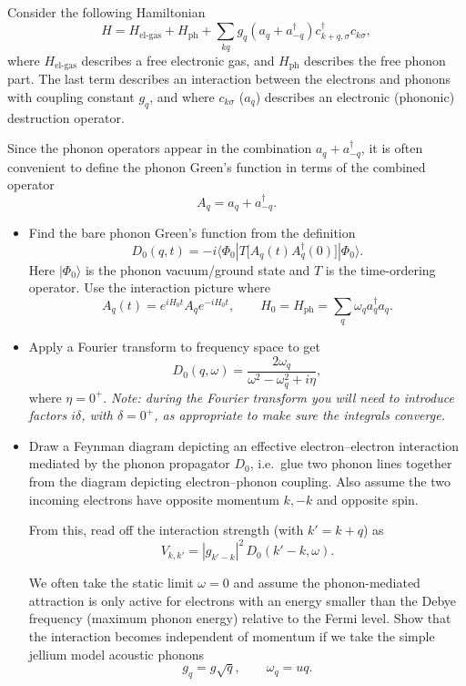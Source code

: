 \begin{Problem}

Consider the following Hamiltonian
\[
H = H_{\text{el-gas}} + H_{\text{ph}} + \sum_{kq} g_q \left(a_q + a_{-q}^\dagger\right)
c_{k+q,\sigma}^\dagger c_{k\sigma},
\]
where \(H_{\text{el-gas}}\) describes a free electronic gas, and
\(H_{\text{ph}}\) describes the free phonon part. The last term describes
an interaction between the electrons and phonons with coupling constant
\(g_q\), and where \(c_{k\sigma}\) (\(a_q\)) describes an electronic
(phononic) destruction operator.

Since the phonon operators appear in the combination
\(a_q + a_{-q}^\dagger\), it is often convenient to define the phonon
Green’s function in terms of the combined operator
\[
A_q = a_q + a_{-q}^\dagger .
\]

\begin{itemize}
\item[(a)] Find the bare phonon Green’s function from the definition
\[
D_0(q,t) = -i \langle \Phi_0 | T \bigl[ A_q(t) A_q^\dagger(0) \bigr] | \Phi_0 \rangle .
\tag{6}
\]
Here \(|\Phi_0\rangle\) is the phonon vacuum/ground state and
\(T\) is the time-ordering operator. Use the interaction picture where
\[
A_q(t) = e^{iH_0 t} A_q e^{-iH_0 t},
\qquad
H_0 = H_{\text{ph}} = \sum_q \omega_q a_q^\dagger a_q .
\]

\item[(b)] Apply a Fourier transform to frequency space to get
\[
D_0(q,\omega) =
\frac{2\omega_q}{\omega^2 - \omega_q^2 + i\eta},
\]
where \(\eta = 0^+\).
\emph{Note: during the Fourier transform you will need to introduce
factors \(i\delta\), with \(\delta = 0^+\), as appropriate to make sure
the integrals converge.}

\item[(c)] Draw a Feynman diagram depicting an effective electron--electron
interaction mediated by the phonon propagator \(D_0\), i.e.\ glue two phonon
lines together from the diagram depicting electron--phonon coupling.
Also assume the two incoming electrons have opposite momentum
\(k,-k\) and opposite spin.

From this, read off the interaction strength (with \(k' = k + q\)) as
\[
V_{k,k'} = |g_{k'-k}|^2 \, D_0(k' - k, \omega).
\]

We often take the static limit \(\omega = 0\) and assume the phonon-mediated
attraction is only active for electrons with an energy smaller than the
Debye frequency (maximum phonon energy) relative to the Fermi level.
Show that the interaction becomes independent of momentum if we take the
simple jellium model acoustic phonons
\[
g_q = g\sqrt{q}, \qquad \omega_q = u q .
\]

\end{itemize}

\end{Problem}

